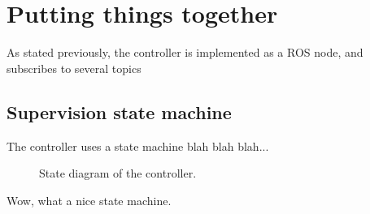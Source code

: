 \section{Putting things together}

As stated previously, the controller is implemented as a ROS node, and
subscribes to several topics

\subsection{Supervision state machine}

The controller uses a state machine blah blah blah...

\begin{figure}[h]
	\centering
	
	\caption{State diagram of the controller.}
\end{figure}

Wow, what a nice state machine.
